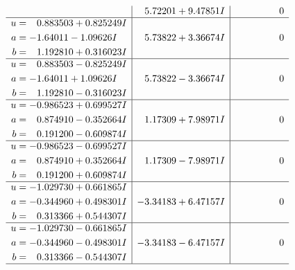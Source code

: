 \documentclass[1p]{elsarticle_modified}
\theoremstyle{definition}
\begin{document}
$$\begin{array}{c|c|c}
 & \phantom{-}5.72201 + 9.47851 I & \phantom{-0.000000 } 0 \\ \hline\begin{aligned}
u &= \phantom{-}0.883503 + 0.825249 I \\
a &= -1.64011 - 1.09626 I \\
b &= \phantom{-}1.192810 + 0.316023 I\end{aligned}
 & \phantom{-}5.73822 + 3.36674 I & \phantom{-0.000000 } 0 \\ \hline\begin{aligned}
u &= \phantom{-}0.883503 - 0.825249 I \\
a &= -1.64011 + 1.09626 I \\
b &= \phantom{-}1.192810 - 0.316023 I\end{aligned}
 & \phantom{-}5.73822 - 3.36674 I & \phantom{-0.000000 } 0 \\ \hline\begin{aligned}
u &= -0.986523 + 0.699527 I \\
a &= \phantom{-}0.874910 - 0.352664 I \\
b &= \phantom{-}0.191200 - 0.609874 I\end{aligned}
 & \phantom{-}1.17309 + 7.98971 I & \phantom{-0.000000 } 0 \\ \hline\begin{aligned}
u &= -0.986523 - 0.699527 I \\
a &= \phantom{-}0.874910 + 0.352664 I \\
b &= \phantom{-}0.191200 + 0.609874 I\end{aligned}
 & \phantom{-}1.17309 - 7.98971 I & \phantom{-0.000000 } 0 \\ \hline\begin{aligned}
u &= -1.029730 + 0.661865 I \\
a &= -0.344960 + 0.498301 I \\
b &= \phantom{-}0.313366 + 0.544307 I\end{aligned}
 & -3.34183 + 6.47157 I & \phantom{-0.000000 } 0 \\ \hline\begin{aligned}
u &= -1.029730 - 0.661865 I \\
a &= -0.344960 - 0.498301 I \\
b &= \phantom{-}0.313366 - 0.544307 I\end{aligned}
 & -3.34183 - 6.47157 I & \phantom{-0.000000 } 0\\
 \hline 
 \end{array}$$\newpage$$\begin{array}{c|c|c}  

\end{array}$$
\end{document}
